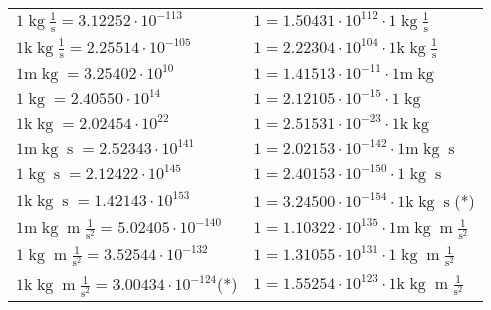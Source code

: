 \begin{center}
\begin{longtable}{l l}
{\color{black}$1 \bm{\mathrm{ }}\operatorname{kg}{}\frac1{\operatorname{s}}{}{} = 3.12252\cdot10^{-113} $}   & {\color{black}$ 1 = 1.50431\cdot10^{112} \cdot 1 \bm{\mathrm{ }}\operatorname{kg}{}\frac1{\operatorname{s}}{}{}$}  \\
{\color{gray}$1 \bm{\mathrm{ k}}\operatorname{kg}{}\frac1{\operatorname{s}}{}{} = 2.25514\cdot10^{-105} $}   & {\color{gray}$ 1 = 2.22304\cdot10^{104} \cdot 1 \bm{\mathrm{ k}}\operatorname{kg}{}\frac1{\operatorname{s}}{}{}$}  \\
{\color{gray}$1 \bm{\mathrm{ m}}\operatorname{kg}{}{}{}{} = 3.25402\cdot10^{10} $}   & {\color{gray}$ 1 = 1.41513\cdot10^{-11} \cdot 1 \bm{\mathrm{ m}}\operatorname{kg}{}{}{}{}$}  \\
{\color{black}$1 \bm{\mathrm{ }}\operatorname{kg}{}{}{}{} = 2.40550\cdot10^{14} $}   & {\color{black}$ 1 = 2.12105\cdot10^{-15} \cdot 1 \bm{\mathrm{ }}\operatorname{kg}{}{}{}{}$}  \\
{\color{gray}$1 \bm{\mathrm{ k}}\operatorname{kg}{}{}{}{} = 2.02454\cdot10^{22} $}   & {\color{gray}$ 1 = 2.51531\cdot10^{-23} \cdot 1 \bm{\mathrm{ k}}\operatorname{kg}{}{}{}{}$}  \\
{\color{gray}$1 \bm{\mathrm{ m}}\operatorname{kg}{}{\operatorname{s}}{}{} = 2.52343\cdot10^{141} $}   & {\color{gray}$ 1 = 2.02153\cdot10^{-142} \cdot 1 \bm{\mathrm{ m}}\operatorname{kg}{}{\operatorname{s}}{}{}$}  \\
{\color{black}$1 \bm{\mathrm{ }}\operatorname{kg}{}{\operatorname{s}}{}{} = 2.12422\cdot10^{145} $}   & {\color{black}$ 1 = 2.40153\cdot10^{-150} \cdot 1 \bm{\mathrm{ }}\operatorname{kg}{}{\operatorname{s}}{}{}$}  \\
{\color{gray}$1 \bm{\mathrm{ k}}\operatorname{kg}{}{\operatorname{s}}{}{} = 1.42143\cdot10^{153} $}   & {\color{gray}$ 1 = 3.24500\cdot10^{-154} \cdot 1 \bm{\mathrm{ k}}\operatorname{kg}{}{\operatorname{s}}{}{}$}\quad(*)\\
{\color{gray}$1 \bm{\mathrm{ m}}\operatorname{kg}{\operatorname{m}}\frac1{\operatorname{s}^2}{}{} = 5.02405\cdot10^{-140} $}   & {\color{gray}$ 1 = 1.10322\cdot10^{135} \cdot 1 \bm{\mathrm{ m}}\operatorname{kg}{\operatorname{m}}\frac1{\operatorname{s}^2}{}{}$}  \\
{\color{black}$1 \bm{\mathrm{ }}\operatorname{kg}{\operatorname{m}}\frac1{\operatorname{s}^2}{}{} = 3.52544\cdot10^{-132} $}   & {\color{black}$ 1 = 1.31055\cdot10^{131} \cdot 1 \bm{\mathrm{ }}\operatorname{kg}{\operatorname{m}}\frac1{\operatorname{s}^2}{}{}$}  \\
{\color{gray}$1 \bm{\mathrm{ k}}\operatorname{kg}{\operatorname{m}}\frac1{\operatorname{s}^2}{}{} = 3.00434\cdot10^{-124} $}\quad(*) & {\color{gray}$ 1 = 1.55254\cdot10^{123} \cdot 1 \bm{\mathrm{ k}}\operatorname{kg}{\operatorname{m}}\frac1{\operatorname{s}^2}{}{}$}  \\

\end{longtable}
\end{center}
